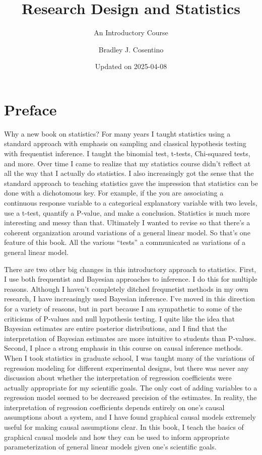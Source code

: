 \documentclass[
]{book}
\title{Research Design and Statistics}
\subtitle{An Introductory Course}
\author{Bradley J. Cosentino}
\date{Updated on 2025-04-08}
\begin{document}
\maketitle

{
\setcounter{tocdepth}{1}
\tableofcontents
}
\chapter*{Preface}\label{preface}

Why a new book on statistics? For many years I taught statistics using a standard approach with emphasis on sampling and classical hypothesis testing with frequentist inference. I taught the binomial test, t-tests, Chi-squared tests, and more. Over time I came to realize that my statistics course didn't reflect at all the way that I actually do statistics. I also increasingly got the sense that the standard approach to teaching statistics gave the impression that statistics can be done with a dichotomous key. For example, if the you are associating a continuous response variable to a categorical explanatory variable with two levels, use a t-test, quantify a P-value, and make a conclusion. Statistics is much more interesting and messy than that. Ultimately I wanted to revise so that there's a coherent organization around variations of a general linear model. So that's one feature of this book. All the various ``tests'' a communicated as variations of a general linear model.

There are two other big changes in this introductory approach to statistics. First, I use both frequentist and Bayesian approaches to inference. I do this for multiple reasons. Although I haven't completely ditched frequnetist methods in my own research, I have increasingly used Bayesian inference. I've moved in this direction for a variety of reasons, but in part because I am sympathetic to some of the criticisms of P-values and null hypothesis testing. I quite like the idea that Bayesian estimates are entire posterior distributions, and I find that the interpretation of Bayesian estimates are more intuitive to students than P-values. Second, I place a strong emphasis in this course on causal inference methods. When I took statistics in graduate school, I was taught many of the variations of regression modeling for different experimental designs, but there was never any discussion about whether the interpretation of regression coefficients were actually appropriate for my scientific goals. The only cost of adding variables to a regression model seemed to be decreased precision of the estimates. In reality, the interpretation of regression coefficients depends entirely on one's causal assumptions about a system, and I have found graphical causal models extremely useful for making causal assumptions clear. In this book, I teach the basics of graphical causal models and how they can be used to inform appropriate parameterization of general linear models given one's scientific goals.
\end{document}
